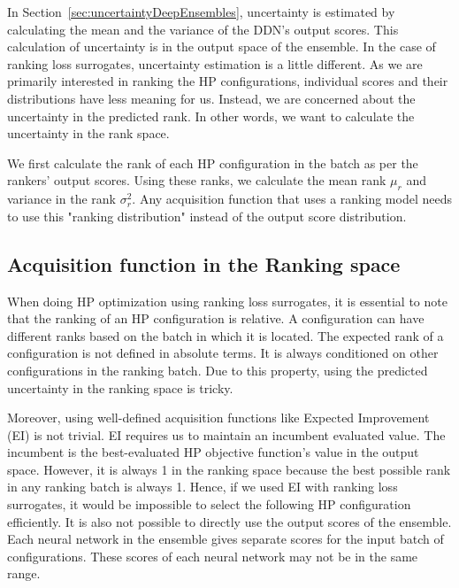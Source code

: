\documentclass[12pt, twoside, ngerman]{report}
\begin{document}
In Section~\ref{sec:uncertaintyDeepEnsembles}, uncertainty is estimated by calculating the mean and the variance of the DDN's output scores. This calculation of uncertainty is in the output space of the ensemble.
In the case of ranking loss surrogates, uncertainty estimation is a  little different.
As we are primarily interested in ranking the HP configurations, individual scores and their distributions have less meaning for us.
Instead, we are concerned about the uncertainty in the predicted rank.
In other words, we want to calculate the uncertainty in the rank space.

We first calculate the rank of each HP configuration in the batch as per the rankers' output scores.
Using these ranks, we calculate the mean rank $\mu_r$ and variance in the rank $\sigma^2_r$.
Any acquisition function that uses a ranking model needs to use this "ranking distribution" instead of the output score distribution.

\subsection{Acquisition function in the Ranking space}
\label{sec:AcquisitionFunctionInRankingSpace}
When doing HP optimization using ranking loss surrogates, it is essential to note that the ranking of an HP configuration is relative.
A configuration can have different ranks based on the batch in which it is located.
The expected rank of a configuration is not defined in absolute terms. It is always conditioned on other configurations in the ranking batch.
Due to this property, using the predicted uncertainty in the ranking space is tricky.

Moreover, using well-defined acquisition functions like Expected Improvement (EI) is not trivial. EI requires us to maintain an incumbent evaluated value. The incumbent is the best-evaluated HP objective function's value in the output space. However, it is always 1 in the ranking space because the best possible rank in any ranking batch is always 1. Hence, if we used EI with ranking loss surrogates, it would be impossible to select the following HP configuration efficiently.
It is also not possible to directly use the output scores of the ensemble. Each neural network in the ensemble gives separate scores for the input batch of configurations. These scores of each neural network may not be in the same range.
\end{document}
